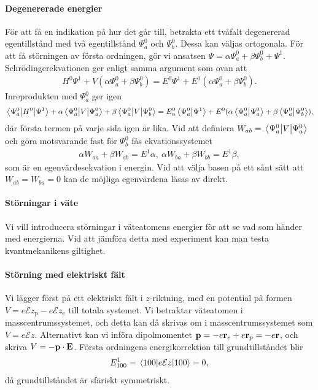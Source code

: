 \paragraph{Degenererade energier}
För att få en indikation på hur det går till, betrakta ett tvåfalt degenererad egentillstånd med två egentillstånd $\Psi_{a}^{0}$ och $\Psi_{b}^{0}$. Dessa kan väljas ortogonala. För att få störningen av första ordningen, gör vi ansatsen $\Psi = \alpha\Psi_{a}^{0} + \beta\Psi_{b}^{0} + \Psi^{1}$. Schrödingerekvationen ger enligt samma argument som ovan att
\begin{align*}
	H^{0}\Psi^{1} + V(\alpha\Psi_{a}^{0} + \beta\Psi_{b}^{0}) = E^{0}\Psi^{1} + E^{1}(\alpha\Psi_{a}^{0} + \beta\Psi_{b}^{0}).
\end{align*}
Inreprodukten med $\Psi_{a}^{0}$ ger igen
\begin{align*}
	\mel{\Psi_{a}^{0}}{H^{0}}{\Psi^{1}} + \alpha\mel{\Psi_{a}^{0}}{V}{\Psi_{a}^{0}} + \beta\mel{\Psi_{a}^{0}}{V}{\Psi_{b}^{0}} = E_{n}^{0}\braket{\Psi_{a}^{0}}{\Psi^{1}} + E^{0}(\alpha\braket{\Psi_{a}^{0}}{\Psi_{a}^{0}} + \beta\braket{\Psi_{a}^{0}}{\Psi_{b}^{0}}),
\end{align*}
där första termen på varje sida igen är lika. Vid att definiera $W_{ab} = \mel{\Psi_{a}^{0}}{V}{\Psi_{a}^{0}}$ och göra motsvarande fast för $\Psi_{b}^{0}$ fås ekvationssystemet
\begin{align*}
	\alpha W_{aa} + \beta W_{ab} = E^{1}\alpha,\ \alpha W_{ba} + \beta W_{bb} = E^{1}\beta,
\end{align*}
som är en egenvärdesekvation i energin. Vid att välja basen på ett sånt sätt att $W_{ab} = W_{ba} = 0$ kan de möjliga egenvärdena läsas av direkt.

\paragraph{Störningar i väte}
Vi vill introducera störningar i väteatomens energier för att se vad som händer med energierna. Vid att jämföra detta med experiment kan man testa kvantmekanikens giltighet.

\paragraph{Störning med elektriskt fält}
Vi lägger först på ett elektriskt fält i $z$-riktning, med en potential på formen $V = e\mathcal{E}z_{\text{p}} - e\mathcal{E}z_{\text{e}}$ till totala systemet. Vi betraktar väteatomen i masscentrumssystemet, och detta kan då skrivas om i masscentrumssystemet som $V = e\mathcal{E}z$. Alternativt kan vi införa dipolmomentet $\vb{p} = -e\vb{r}_{e} + e\vb{r}_{p} = -e\vb{r}$, och skriva $V = -\vb{p}\cdot\vb{E}$. Första ordningens energikorrektion till grundtillståndet blir
\begin{align*}
	E_{100}^{1} = \expval{e\mathcal{E}z}{100} = 0,
\end{align*}
då grundtillståndet är sfäriskt symmetriskt.

